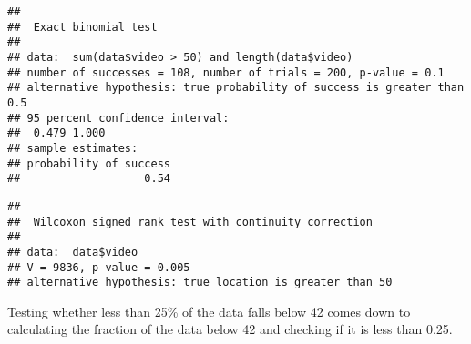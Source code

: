 \documentclass[
]{article}
\newenvironment{Shaded}{\begin{snugshade}}{\end{snugshade}}
\newcommand{\AttributeTok}[1]{\textcolor[rgb]{0.13,0.29,0.53}{#1}}
\newcommand{\DecValTok}[1]{\textcolor[rgb]{0.00,0.00,0.81}{#1}}
\newcommand{\FloatTok}[1]{\textcolor[rgb]{0.00,0.00,0.81}{#1}}
\newcommand{\FunctionTok}[1]{\textcolor[rgb]{0.13,0.29,0.53}{\textbf{#1}}}
\newcommand{\NormalTok}[1]{#1}
\newcommand{\SpecialCharTok}[1]{\textcolor[rgb]{0.81,0.36,0.00}{\textbf{#1}}}
\newcommand{\StringTok}[1]{\textcolor[rgb]{0.31,0.60,0.02}{#1}}
\begin{document}
\begin{Shaded}
\end{Shaded}

\begin{verbatim}
## 
##  Exact binomial test
## 
## data:  sum(data$video > 50) and length(data$video)
## number of successes = 108, number of trials = 200, p-value = 0.1
## alternative hypothesis: true probability of success is greater than 0.5
## 95 percent confidence interval:
##  0.479 1.000
## sample estimates:
## probability of success 
##                   0.54
\end{verbatim}

\begin{Shaded}
\end{Shaded}

\begin{verbatim}
## 
##  Wilcoxon signed rank test with continuity correction
## 
## data:  data$video
## V = 9836, p-value = 0.005
## alternative hypothesis: true location is greater than 50
\end{verbatim}

Testing whether less than 25\% of the data falls below 42 comes down to
calculating the fraction of the data below 42 and checking if it is less
than 0.25.

\begin{Shaded}
\end{Shaded}
\end{document}
